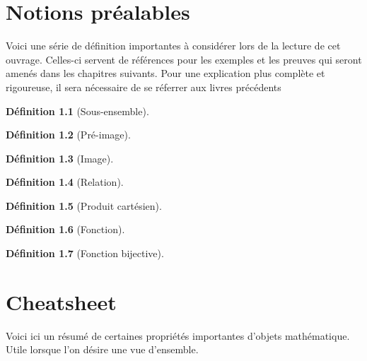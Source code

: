 \documentclass[12pt]{book}
\theoremstyle{definition}
\newtheorem{definition}{Définition}[section]
\begin{document}
\chapter{Notions préalables}
Voici une série de définition importantes à considérer lors de la lecture de cet ouvrage. Celles-ci servent
de références pour les exemples et les preuves qui seront amenés dans les chapitres suivants. Pour une explication
plus complète et rigoureuse, il sera nécessaire de se réferrer aux livres précédents

\begin{definition}[Sous-ensemble]
    \label{def:sous_ensemble}
\end{definition}

\begin{definition}[Pré-image]
    \label{def:pre_image}
\end{definition}

\begin{definition}[Image]
    \label{def:image}
\end{definition}

\begin{definition}[Relation]
    \label{def:relation}
\end{definition}

\begin{definition}[Produit cartésien]
    \label{def:produit_cartesien}
\end{definition}

\begin{definition}[Fonction]
    \label{def:fonction}
\end{definition}

\begin{definition}[Fonction bijective]
    \label{def:bijective}
    
\end{definition}


\chapter{Cheatsheet}
Voici ici un résumé de certaines propriétés importantes d'objets mathématique. Utile lorsque l'on désire une vue d'ensemble.
\end{document}
